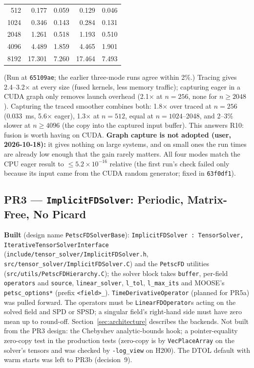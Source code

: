 \documentclass[11pt]{article}
\newcommand{\pr}[2]{\subsection{PR#1 --- #2}}
\begin{document}
{\begin{center}
\begin{tabular}{rrrrr}
512 & 0.177 & 0.059 & 0.129 & 0.046 \\
1024 & 0.346 & 0.143 & 0.284 & 0.131 \\
2048 & 1.261 & 0.518 & 1.193 & 0.510 \\
4096 & 4.489 & 1.859 & 4.465 & 1.901 \\
8192 & 17.301 & 7.260 & 17.464 & 7.493 \\
\bottomrule
\end{tabular}
\end{center}
(Run at \texttt{65109ae}; the earlier three-mode runs agree within 2\%.)
Tracing gives 2.4--3.2$\times$ at every size (fused kernels, less memory
traffic); capturing eager in a CUDA graph only removes launch overhead
(2.1$\times$ at $n=256$, none for $n\ge2048$). Capturing the traced smoother
combines both: 1.8$\times$ over traced at $n=256$ (0.033~ms, 5.6$\times$ eager),
1.3$\times$ at $n=512$, equal at $n=1024$--2048, and 2--3\% slower at $n\ge4096$
(the copy into the captured input buffer). This answers R10: fusion is worth
having on CUDA. \textbf{Graph capture is not adopted (user, 2026-10-18):} it
gives nothing on large systems, and on small ones the run times are already low
enough that the gain rarely matters.
All four modes match the CPU eager result to $\le5.2\times10^{-16}$ relative
(the first run's check failed only because its input came from the CUDA random
generator; fixed in \texttt{63f0df1}).}

\pr{3}{\texttt{ImplicitFDSolver}: Periodic, Matrix-Free, No Picard}
\textbf{Built} (design name \texttt{PetscFDSolverBase}):
\texttt{ImplicitFDSolver : TensorSolver, IterativeTensorSolverInterface}
(\texttt{include/tensor\_solver/ImplicitFDSolver.h},
\texttt{src/tensor\_solver/ImplicitFDSolver.C}) and the \texttt{PetscFD}
utilities (\texttt{src/utils/PetscFDHierarchy.C}); the solver block takes
\texttt{buffer}, per-field \texttt{operators} and \texttt{source},
\texttt{linear\_solver}, \texttt{l\_tol}, \texttt{l\_max\_its} and MOOSE's
\texttt{petsc\_options*} (prefix \texttt{<field>\_}).
\texttt{TimeDerivativeOperator} (planned for PR5a) was pulled forward. The
operators must be \texttt{LinearFDOperator}s acting on the solved field and
SPD or SPSD; a singular field's right-hand side must have zero mean up to
round-off. Section~\ref{sec:architecture} describes the backends.
Not built from the PR3 design: the Chebyshev analytic-bounds hook; a
pointer-equality zero-copy test in the production tests (zero-copy is by
\texttt{VecPlaceArray} on the solver's tensors and was checked by
\texttt{-log\_view} on H200). The DTOL default with warm starts was left to PR3b
(decision~9).
\end{document}
